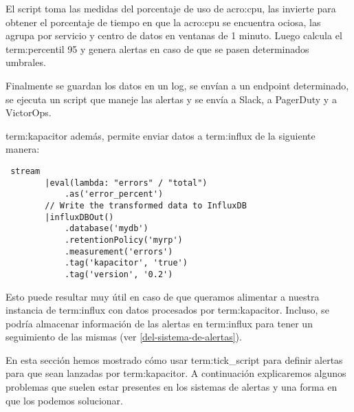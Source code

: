 El script toma las medidas del porcentaje de uso de \gls{acro:cpu}, las
invierte para obtener el porcentaje de tiempo en que la \gls{acro:cpu} se
encuentra ociosa, las agrupa por servicio y centro de datos en ventanas de 1
minuto. Luego calcula el \gls{term:percentil} 95 y genera alertas en caso de
que se pasen determinados umbrales.

Finalmente se guardan los datos en un log, se envían a un endpoint determinado,
se ejecuta un script que maneje las alertas y se envía a Slack, a PagerDuty y a
VictorOps.

\gls{term:kapacitor} además, permite enviar datos a \gls{term:influx} de la
siguiente manera:

\begin{lstlisting}
 stream
        |eval(lambda: "errors" / "total")
            .as('error_percent')
        // Write the transformed data to InfluxDB
        |influxDBOut()
            .database('mydb')
            .retentionPolicy('myrp')
            .measurement('errors')
            .tag('kapacitor', 'true')
            .tag('version', '0.2')
\end{lstlisting}


Esto puede resultar muy útil en caso de que queramos alimentar a nuestra
instancia de \gls{term:influx} con datos procesados por \gls{term:kapacitor}.
Incluso, se podría almacenar información de las alertas en \gls{term:influx}
para tener un seguimiento de las mismas (ver \autoref{del-sistema-de-alertas}).

En esta sección hemos mostrado cómo usar \gls{term:tick_script} para definir
alertas para que sean lanzadas por \gls{term:kapacitor}. A continuación
explicaremos algunos problemas que suelen estar presentes en los sistemas de
alertas y una forma en que los podemos solucionar.
